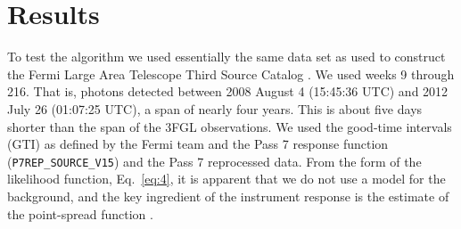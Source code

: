 \documentclass[useAMS,usenatbib]{mn2e}
\begin{document}
\section{Results}
\label{sec:results}
To test the algorithm we used essentially the same data set as used to
construct the Fermi Large Area Telescope Third Source Catalog
\cite[3FGL][]{2015ApJS..218...23A}.  We used weeks 9 through 216. That
is, photons detected between 2008 August 4 (15:45:36 UTC) and 2012
July 26 (01:07:25 UTC), a span of nearly four years.  This is about
five days shorter than the span of the 3FGL observations.  We used the
good-time intervals (GTI) as defined by the Fermi team and the Pass 7
response function (\texttt{P7REP\_SOURCE\_V15}) and the Pass 7
reprocessed data.  From the form of the likelihood function,
Eq.~\ref{eq:4}, it is apparent that we do not use a model for the
background, and the key ingredient of the instrument response is the
estimate of the point-spread function \citep{2012ApJS..203....4A}.
\end{document}
